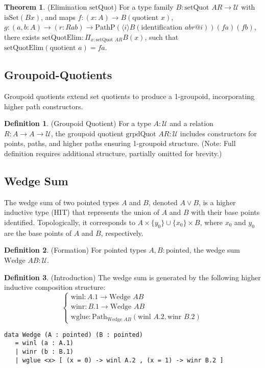 \documentclass{article}
\theoremstyle{definition}
\newtheorem{theorem}{Theorem}
\newtheorem{definition}{Definition}
\begin{document}
\begin{theorem} (Elimination $\text{setQuot}$)
For a type family $B : \text{setQuot } A R \to \mathcal{U}$ with $\text{isSet}(B x)$, and maps $f : (x : A) \to B(\text{quotient } x)$, $g : (a, b : A) \to (r : R a b) \to \text{PathP} (\langle i \rangle B(\text{identification } a b r @ i)) (f a) (f b)$, there exists $\text{setQuotElim} : \Pi_{x:\text{setQuot } A R} B(x)$, such that $\text{setQuotElim}(\text{quotient } a) = f a$.
\end{theorem}

\subsection{Groupoid-Quotients}
Groupoid quotients extend set quotients to produce a 1-groupoid, incorporating higher path constructors.

\begin{definition} (Groupoid Quotient)
For a type $A : \mathcal{U}$ and a relation $R : A \to A \to \mathcal{U}$, the groupoid quotient $\text{grpdQuot } A R : \mathcal{U}$ includes constructors for points, paths, and higher paths ensuring 1-groupoid structure. (Note: Full definition requires additional structure, partially omitted for brevity.)
\end{definition}

\newpage

\subsection{Wedge Sum}
The wedge sum of two pointed types $A$ and $B$, denoted $A \vee B$, is a higher inductive type (HIT) that represents the union of $A$ and $B$ with their base points identified. Topologically, it corresponds to $A \times \{ y_0 \} \cup \{ x_0 \} \times B$, where $x_0$ and $y_0$ are the base points of $A$ and $B$, respectively.

\begin{definition} (Formation)
For pointed types $A, B : \text{pointed}$, the wedge sum $\text{Wedge } A B : \mathcal{U}$.
\end{definition}

\begin{definition} (Introduction)
The wedge sum is generated by the following higher inductive composition structure:
\[
\begin{cases}
\text{winl} : A.1 \to \text{Wedge } A B \\
\text{winr} : B.1 \to \text{Wedge } A B \\
\text{wglue} : \text{Path}_{\text{Wedge } A B} (\text{winl } A.2, \text{winr } B.2)
\end{cases}
\]
\begin{lstlisting}
data Wedge (A : pointed) (B : pointed)
   = winl (a : A.1)
   | winr (b : B.1)
   | wglue <x> [ (x = 0) -> winl A.2 , (x = 1) -> winr B.2 ]
\end{lstlisting}
\end{definition}
\end{document}
